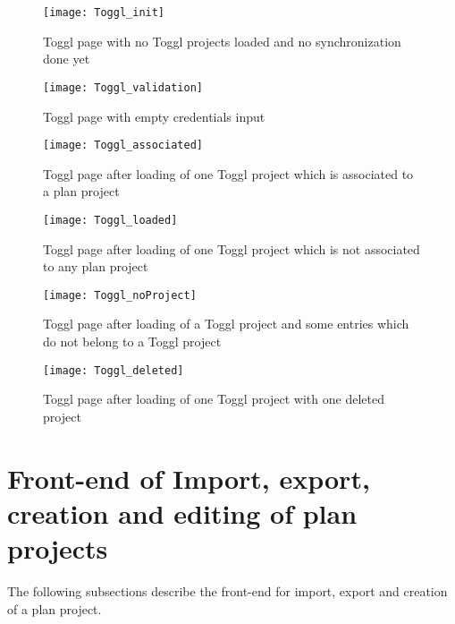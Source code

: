 \begin{figure}[H]
	\centering
	\texttt{[image: Toggl\_init]}
	\caption{Toggl page with no Toggl projects loaded and no synchronization done yet}
	\label{Toggl page initial}
\end{figure}

\begin{figure}[H]
	\centering
	\texttt{[image: Toggl\_validation]}
	\caption{Toggl page with empty credentials input}
	\label{Toggl page validation}
\end{figure}

\begin{figure}[H]
	\centering
	\texttt{[image: Toggl\_associated]}
	\caption{Toggl page after loading of one Toggl project which is associated to a plan project}
	\label{Toggl associated}
\end{figure}

\begin{figure}[H]
	\centering
	\texttt{[image: Toggl\_loaded]}
	\caption{Toggl page after loading of one Toggl project which is not associated to any plan project}
	\label{Toggl loaded}
\end{figure}

\begin{figure}[H]
	\centering
	\texttt{[image: Toggl\_noProject]}
	\caption{Toggl page after loading of a Toggl project and some entries which do not belong to a Toggl project}
	\label{Toggl no project}
\end{figure}

\begin{figure}[H]
	\centering
	\texttt{[image: Toggl\_deleted]}
	\caption{Toggl page after loading of one Toggl project with one deleted project}
	\label{Toggl deleted}
\end{figure}

\section{Front-end of Import, export, creation and editing of plan projects}
The following subsections describe the front-end for import, export and creation of a plan project.

